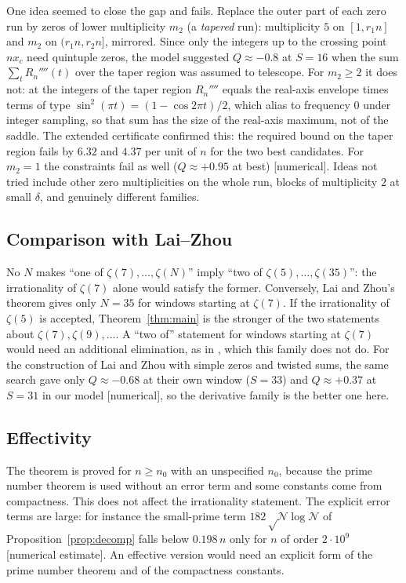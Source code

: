 \documentclass[11pt]{amsart}
\theoremstyle{definition}
\theoremstyle{remark}
\numberwithin{equation}{section}
\newcommand{\cN}{\mathcal{N}}
\begin{document}
One idea seemed to close the gap and fails. Replace the outer part of each zero run by zeros of lower multiplicity
$m_2$ (a \emph{tapered} run): multiplicity $5$ on $[1,r_1n]$ and $m_2$ on $(r_1n,r_2n]$, mirrored. Since only the
integers up to the crossing point $nx_c$ need quintuple zeros, the model suggested $Q\approx-0.8$ at $S=16$ when the
sum $\sum_tR_n''''(t)$ over the taper region was assumed to telescope. For $m_2\ge2$ it does not: at the integers of
the taper region $R_n''''$ equals the real-axis envelope times terms of type $\sin^2(\pi t)=(1-\cos2\pi t)/2$, which
alias to frequency $0$ under integer sampling, so that sum has the size of the real-axis maximum, not of the saddle.
The extended certificate confirmed this: the required bound on the taper region fails by $6.32$ and $4.37$ per unit of
$n$ for the two best candidates. For $m_2=1$ the constraints fail as well ($Q\approx+0.95$ at best) [numerical].
Ideas not tried include other zero multiplicities on the whole run, blocks of multiplicity $2$ at small $\delta$, and
genuinely different families.

\subsection{\texorpdfstring{Comparison with Lai--Zhou}{Comparison with Lai-Zhou}}
No $N$ makes ``one of $\zeta(7),\dots,\zeta(N)$'' imply ``two of $\zeta(5),\dots,\zeta(35)$'': the irrationality of
$\zeta(7)$ alone would satisfy the former. Conversely, Lai and Zhou's theorem gives only $N=35$ for windows starting at
$\zeta(7)$. If the irrationality of $\zeta(5)$ is accepted, Theorem~\ref{thm:main} is the stronger of the two
statements about $\zeta(7),\zeta(9),\dots$. A ``two of'' statement for windows starting at $\zeta(7)$ would need an
additional elimination, as in \cite{LaiZhou2022,RivoalZudilin2020}, which this family does not do. For the
construction of Lai and Zhou with simple zeros and twisted sums, the same search gave only $Q\approx-0.68$ at their
own window ($S=33$) and $Q\approx+0.37$ at $S=31$ in our model [numerical], so the derivative family is the better one
here.

\subsection{Effectivity}
The theorem is proved for $n\ge n_0$ with an unspecified $n_0$, because the prime number theorem is used without an
error term and some constants come from compactness. This does not affect the irrationality statement. The explicit
error terms are large: for instance the small-prime term $182\sqrt\cN\log\cN$ of Proposition~\ref{prop:decomp} falls
below $0.198\,n$ only for $n$ of order $2\cdot10^9$ [numerical estimate]. An effective version would need an explicit
form of the prime number theorem and of the compactness constants.
\end{document}
